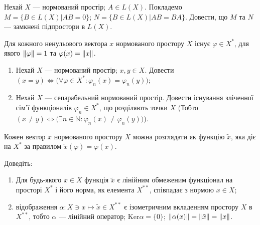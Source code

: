 \begin{exercise}
    Нехай $X$ --- нормований простір; $A \in L(X)$. Покладемо $M = \{B \in L(X) | AB=0\}$;
    $N = \{B \in L(X) | AB=BA\}$. Довести, що $M$ та $N$ --- замкнені підпростори в $L(X)$.
\end{exercise}

\begin{theory}
    \begin{theorem*}
        Для кожного ненульового вектора $x$ нормованого простору $X$ існує $\varphi \in X^*$,
        для якого $\left\lVert\varphi\right\rVert = 1$ та $\varphi(x) = \left\lVert x\right\rVert$. 
    \end{theorem*}
\end{theory}

\begin{exercise} 
    \begin{enumerate}[label=\ukr*)]
        \item Нехай $X$ --- нормований простір; $x,y \in X$. Довести $(x=y) \Leftrightarrow 
        \big(\forall\varphi \in X^*: \varphi_n(x) = \varphi_n(y)\big)$;
        \item Нехай $X$ --- сепарабельний нормований простір. Довести існування зліченної сім'ї
        функціоналів $\varphi_n \in X^*$, що розділяють точки $X$ \Big(Тобто 
        $(x\neq y) \Leftrightarrow \big(\exists n \in \mathbb{N}: \varphi_n(x) \neq \varphi_n(y)\big)$\Big).
    \end{enumerate}
\end{exercise}

\begin{theory}
    Кожен вектор $x$ нормованого простору $X$ можна розглядати як функцію $\tilde{x}$, яка 
    діє на $X^*$ за правилом $\tilde{x}(\varphi)=\varphi(x)$.
\end{theory}

\begin{exercise}
    Доведіть:~
    \begin{enumerate}[label=\ukr*)]
        \item Для будь-якого $x \in X$ функція $\tilde{x}$ є лінійним обмеженим функціонал на просторі $X^*$
        і його норма, як елемента $X^{**}$, співпадає з нормою $x \in X$;
        \item відображення $\alpha: X \ni x \mapsto \tilde{x} \in X^{**}$ є ізометричним вкладенням
        простору $X$ в $X^{**}$, тобто $\alpha$ --- лінійний оператор; $\mathrm{Ker}\alpha = \{0\}$; 
        $\left\lVert\alpha(x)\right\rVert = \left\lVert\tilde{x}\right\rVert = \left\lVert x\right\rVert$.
    \end{enumerate}
\end{exercise}

